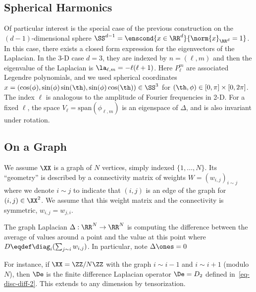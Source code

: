 \subsection{Spherical Harmonics}
\label{sec-spherical-harm}

Of particular interest is the special case of the previous construction on the $(d-1)$-dimensional sphere $\SS^{d-1} = \enscond{x \in \RR^d}{\norm{x}_{\RR^d}=1}$.
% 
In this case, there exists a closed form expression for the eigenvectors of the Laplacian. In the 3-D case $d=3$, they are indexed by $n=(\ell,m)$
and then the eigenvalue of the Laplacian is $\la_{\ell,m} = -\ell(\ell+1)$. Here $P_{\ell}^m$ are associated Legendre polynomials, and we used spherical coordinates $x=(\cos(\phi),\sin(\phi)\sin(\th),\sin(\phi)\cos(\th)) \in \SS^3$ for $(\th,\phi) \in [0,\pi] \times [0,2\pi]$.
%
The index $\ell$ is analogous to the amplitude of Fourier frequencies in 2-D. 
%
For a fixed $\ell$, the space $V_\ell = \text{span}( \phi_{\ell,m} )$ is an eigenspace of $\Delta$, and is also invariant under rotation. 
	

\subsection{On a Graph}

We assume $\XX$ is a graph of $N$ vertices, simply indexed $\{1,\ldots,N\}$. Its ``geometry'' is described by a connectivity matrix of weights $W=(w_{i,j})_{i \sim j}$ where we denote $i \sim j$ to indicate that $(i,j)$ is an edge of the graph for $(i,j) \in \XX^2$. We assume that this weight matrix and the connectivity is symmetric, $w_{i,j}=w_{j,i}$. 

The graph Laplacian $\Delta : \RR^N \rightarrow \RR^N$ is computing the difference between the average of values around a point and the value at this point
where $D \eqdef \diag_i(\sum_{j \sim i} w_{i,j})$. In particular, note $\Delta \ones=0$

For instance, if $\XX = \ZZ/N\ZZ$ with the graph $i \sim i-1$ and $i \sim i+1$ (modulo $N$), then $\De$ is the finite difference Laplacian operator $\De=D_2$ defined in~\eqref{eq-disc-diff-2}. This extends to any dimension by tensorization. 

